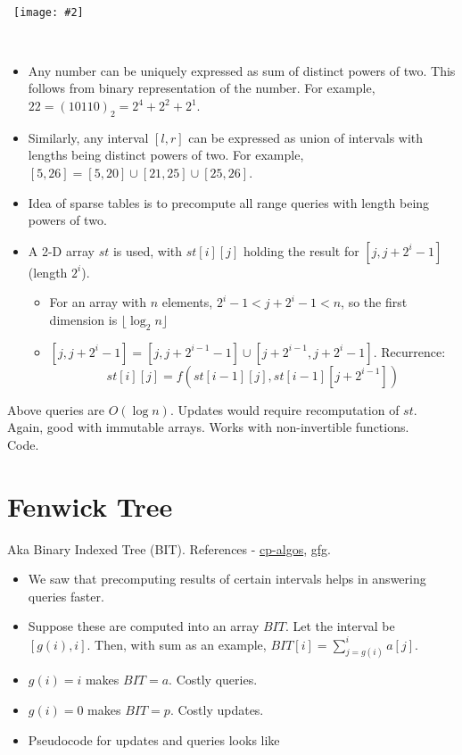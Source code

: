 \documentclass{article}
\newcommand{\image}[2]{\
    \begin{center}\
        \texttt{[image: \#2]}\
    \end{center}\
}
\begin{document}
\begin{sloppypar}
    \image{0.9}{../images/st.png}

    \begin{itemize}
        \item Any number can be uniquely expressed as sum of distinct powers of two. This follows from binary representation of the number. For example, $22 = (10110)_2 = 2^4 + 2^2 + 2^1$.
        \item Similarly, any interval $[l,r]$ can be expressed as union of intervals with lengths being distinct powers of two. For example, $[5,26] = [5,20] \cup [21,25] \cup [25,26]$.
        \item Idea of sparse tables is to precompute all range queries with length being powers of two.
        \item A 2-D array $st$ is used, with $st[i][j]$ holding the result for $[j, j+2^i-1]$ (length $2^i$).
        \begin{itemize}
            \item For an array with $n$ elements, $2^i-1 < j+2^i-1 < n$, so the first dimension is $\lfloor \log_2{n}\rfloor$
            \item $[j,j+2^i-1] = [j,j+2^{i-1}-1]\cup [j+2^{i-1},j+2^i-1]$. Recurrence:
            $$st[i][j] = f(st[i-1][j], st[i-1][j+2^{i-1}])$$
        \end{itemize}
    \end{itemize}

    \noindent Above queries are $O(\log n)$. Updates would require recomputation of $st$. Again, good with immutable arrays. Works with non-invertible functions.\\
    Code.

    \section{Fenwick Tree}
    Aka Binary Indexed Tree (BIT). References - \href{https://cp-algorithms.com/data_structures/fenwick.html}{cp-algos}, \href{https://www.geeksforgeeks.org/binary-indexed-tree-or-fenwick-tree-2/}{gfg}.

    \begin{itemize}
        \item We saw that precomputing results of certain intervals helps in answering queries faster.
        \item Suppose these are computed into an array $BIT$. Let the interval be $[g(i),i]$. Then, with sum as an example, $BIT[i] = \sum_{j=g(i)}^i a[j]$.
        \item $g(i)=i$ makes $BIT=a$. Costly queries.
        \item $g(i)=0$ makes $BIT=p$. Costly updates.
        \item Pseudocode for updates and queries looks like


\end{itemize}
\end{sloppypar}
\end{document}

